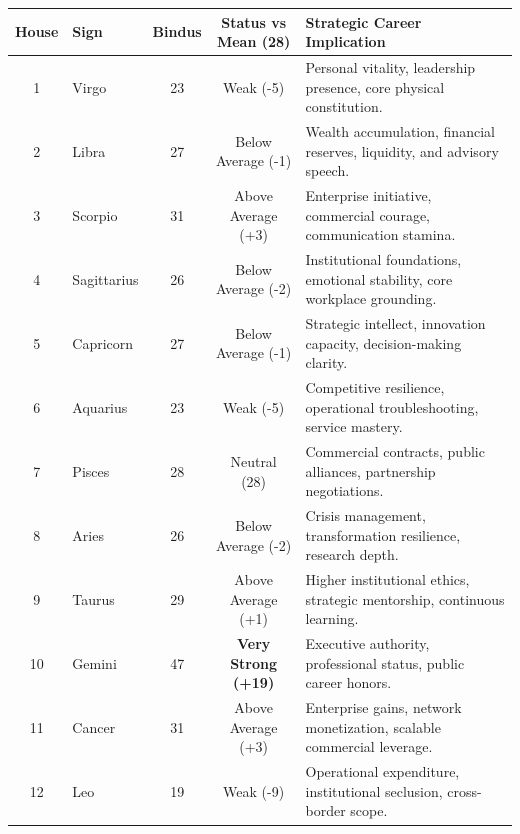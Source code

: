 \begin{executivecard}
  \sffamily\fontsize{8}{11.5}\selectfont
  \begin{tabularx}{\linewidth}{@{}c l c c X@{}}
    \toprule
    \textbf{House} & \textbf{Sign} & \textbf{Bindus} & \textbf{Status vs Mean (28)} & \textbf{Strategic Career Implication} \\
    \midrule
    1 & Virgo & 23 & Weak (-5) & Personal vitality, leadership presence, core physical constitution. \\
    2 & Libra & 27 & Below Average (-1) & Wealth accumulation, financial reserves, liquidity, and advisory speech. \\
    3 & Scorpio & 31 & Above Average (+3) & Enterprise initiative, commercial courage, communication stamina. \\
    4 & Sagittarius & 26 & Below Average (-2) & Institutional foundations, emotional stability, core workplace grounding. \\
    5 & Capricorn & 27 & Below Average (-1) & Strategic intellect, innovation capacity, decision-making clarity. \\
    6 & Aquarius & 23 & Weak (-5) & Competitive resilience, operational troubleshooting, service mastery. \\
    7 & Pisces & 28 & Neutral (28) & Commercial contracts, public alliances, partnership negotiations. \\
    8 & Aries & 26 & Below Average (-2) & Crisis management, transformation resilience, research depth. \\
    9 & Taurus & 29 & Above Average (+1) & Higher institutional ethics, strategic mentorship, continuous learning. \\
    10 & Gemini & 47 & \textbf{Very Strong (+19)} & Executive authority, professional status, public career honors. \\
    11 & Cancer & 31 & Above Average (+3) & Enterprise gains, network monetization, scalable commercial leverage. \\
    12 & Leo & 19 & Weak (-9) & Operational expenditure, institutional seclusion, cross-border scope. \\
    \bottomrule
  \end{tabularx}
\end{executivecard}\vspace{2mm}

